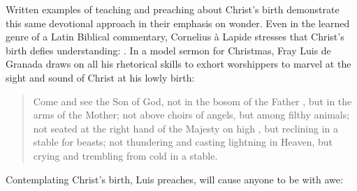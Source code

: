 Written examples of teaching and preaching about Christ's birth demonstrate this
same devotional approach in their emphasis on wonder.
Even in the learned genre of a Latin Biblical commentary, Cornelius à Lapide
stresses that Christ's birth defies understanding: 
.%
    \Autocite
    [50, on Mt 1:16: .]
    {Lapide:Gospels19C}
In a model sermon for Christmas, Fray Luis de Granada draws on all his
rhetorical skills to exhort worshippers to marvel at the sight and sound of
Christ at his lowly birth:
\begin{quote}
    Come and see the Son of God, not in the bosom of the Father , but
    in the arms of the Mother; not above choirs of angels, but among filthy
    animals; not seated at the right hand of the Majesty on high ,
    but reclining in a stable for beasts; not thundering and casting lightning
    in Heaven, but crying and trembling from cold in a stable.%
        \Autocite
        [37: .]
        {LuisdeGranada:Xmas}
\end{quote}
Contemplating Christ's birth, Luis preaches, will cause anyone to be
 with awe:
